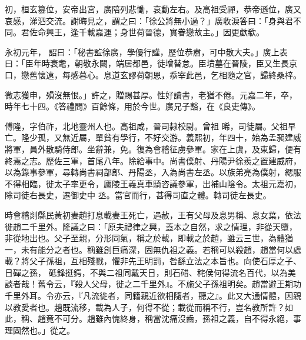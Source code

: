 \begin{pinyinscope}
 初，桓玄篡位，安帝出宮，廣陪列悲慟，哀動左右。及高祖受禪，恭帝遜位，廣又哀感，涕泗交流。謝晦見之，謂之曰：「徐公將無小過？」廣收淚答曰：「身與君不同。君佐命興王，逢千載嘉運；身世荷晉德，實眷戀故主。」因更歔欷。



 永初元年，
 詔曰：「秘書監徐廣，學優行謹，歷位恭肅，可中散大夫。」廣上表曰：「臣年時衰耄，朝敬永闕，端居都邑，徒增替怠。臣墳墓在晉陵，臣又生長京口，戀舊懷遠，每感暮心。息道玄謬荷朝恩，忝宰此邑，乞相隨之官，歸終桑梓。



 微志獲申，殞沒無恨。」許之，贈賜甚厚。性好讀書，老猶不倦。元嘉二年，卒，時年七十四。《答禮問》百餘條，用於今世。廣兄子豁，在《良吏傳》。



 傅隆，字伯祚，北地靈州人也。高祖咸，晉司隸校尉。曾祖
 晞，司徒屬。父祖早亡。隆少孤，又無近屬，單貧有學行，不好交游。義熙初，年四十，始為孟昶建威將軍，員外散騎侍郎。坐辭兼，免。復為會稽征虜參軍。家在上虞，及東歸，便有終焉之志。歷佐三軍，首尾八年。除給事中。尚書僕射、丹陽尹徐羨之置建威府，以為錄事參軍，尋轉尚書祠部郎、丹陽丞，入為尚書左丞。以族弟亮為僕射，緦服不得相臨，徙太子率更令，廬陵王義真車騎咨議參軍，出補山陰令。太祖元嘉初，除司徒右長史，遷御史中
 丞。當官而行，甚得司直之體。轉司徒左長史。



 時會稽剡縣民黃初妻趙打息載妻王死亡，遇赦，王有父母及息男稱、息女葉，依法徙趙二千里外。隆議之曰：「原夫禮律之興，蓋本之自然，求之情理，非從天墮，非從地出也。父子至親，分形同氣，稱之於載，即載之於趙，雖云三世，為體猶一，未有能分之者也。稱雖創巨痛深，固無仇祖之義。若稱可以殺趙，趙當何以處載？將父子孫祖，互相殘戮，懼非先王明罰，咎繇立法之本旨也。向使石厚之子、日磾之孫，
 砥鋒挺鍔，不與二祖同戴天日，則石碏、秺侯何得流名百代，以為美談者哉！舊令云，『殺人父母，徙之二千里外』。不施父子孫祖明矣。趙當避王期功千里外耳。令亦云，『凡流徙者，同籍親近欲相隨者，聽之』。此又大通情體，因親以教愛者也。趙既流移，載為人子，何得不從；載從而稱不行，豈名教所許？如此，稱、趙竟不可分。趙雖內愧終身，稱當沈痛沒齒，孫祖之義，自不得永絕，事理固然也。」從之。




\end{pinyinscope}
